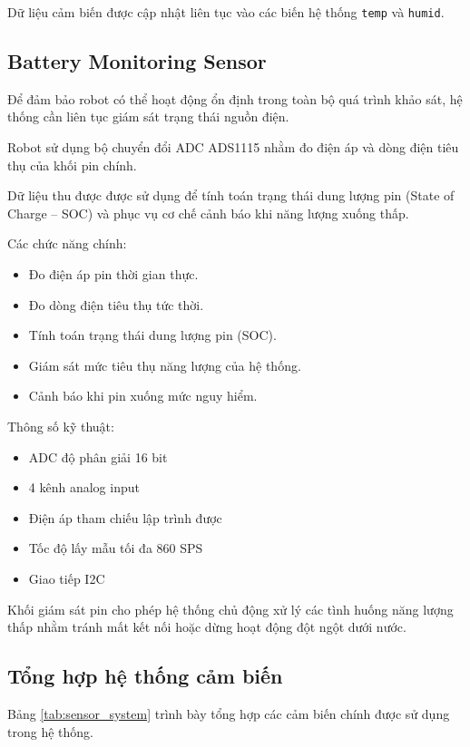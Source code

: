 \documentclass[../DoAn.tex]{subfiles}
\begin{document}
Dữ liệu cảm biến được cập nhật liên tục vào các biến hệ thống \texttt{temp} và \texttt{humid}.

\subsection{Battery Monitoring Sensor}

Để đảm bảo robot có thể hoạt động ổn định trong toàn bộ quá trình khảo sát, hệ thống cần liên tục giám sát trạng thái nguồn điện.

Robot sử dụng bộ chuyển đổi ADC ADS1115 nhằm đo điện áp và dòng điện tiêu thụ của khối pin chính.

Dữ liệu thu được được sử dụng để tính toán trạng thái dung lượng pin (State of Charge -- SOC) và phục vụ cơ chế cảnh báo khi năng lượng xuống thấp.

Các chức năng chính:

\begin{itemize}
    \item Đo điện áp pin thời gian thực.
    \item Đo dòng điện tiêu thụ tức thời.
    \item Tính toán trạng thái dung lượng pin (SOC).
    \item Giám sát mức tiêu thụ năng lượng của hệ thống.
    \item Cảnh báo khi pin xuống mức nguy hiểm.
\end{itemize}

Thông số kỹ thuật:

\begin{itemize}
    \item ADC độ phân giải 16 bit
    \item 4 kênh analog input
    \item Điện áp tham chiếu lập trình được
    \item Tốc độ lấy mẫu tối đa 860 SPS
    \item Giao tiếp I2C
\end{itemize}

Khối giám sát pin cho phép hệ thống chủ động xử lý các tình huống năng lượng thấp nhằm tránh mất kết nối hoặc dừng hoạt động đột ngột dưới nước.

\subsection{Tổng hợp hệ thống cảm biến}

Bảng \ref{tab:sensor_system} trình bày tổng hợp các cảm biến chính được sử dụng trong hệ thống.
\end{document}
